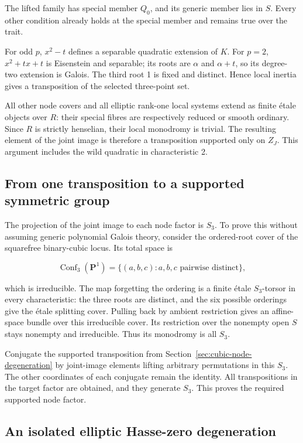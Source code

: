 \documentclass[11pt]{article}
\begin{document}
The lifted family has special member \(Q_0\), and its generic member lies in \(S\). Every other condition already holds at the special member and remains true over the trait.

For odd \(p\), \(x^2-t\) defines a separable quadratic extension of \(K\). For \(p=2\), \(x^2+tx+t\) is Eisenstein and separable; its roots are \(\alpha\) and \(\alpha+t\), so its degree-two extension is Galois. The third root 1 is fixed and distinct. Hence local inertia gives a transposition of the selected three-point set.

All other node covers and all elliptic rank-one local systems extend as finite étale objects over \(R\): their special fibres are respectively reduced or smooth ordinary. Since \(R\) is strictly henselian, their local monodromy is trivial. The resulting element of the joint image is therefore a transposition supported only on \(Z_J\). This argument includes the wild quadratic in characteristic 2.

\subsection{From one transposition to a supported symmetric group}\label{sec:cubic-node-group}

The projection of the joint image to each node factor is \(S_3\). To prove this without assuming generic polynomial Galois theory, consider the ordered-root cover of the squarefree binary-cubic locus. Its total space is

\[
\operatorname{Conf}_3(\mathbf P^1)
=\{(a,b,c):a,b,c\text{ pairwise distinct}\},
\]

which is irreducible. The map forgetting the ordering is a finite étale \(S_3\)-torsor in every characteristic: the three roots are distinct, and the six possible orderings give the étale splitting cover. Pulling back by ambient restriction gives an affine-space bundle over this irreducible cover. Its restriction over the nonempty open \(S\) stays nonempty and irreducible. Thus its monodromy is all \(S_3\).

Conjugate the supported transposition from Section~\ref{sec:cubic-node-degeneration} by joint-image elements lifting arbitrary permutations in this \(S_3\). The other coordinates of each conjugate remain the identity. All transpositions in the target factor are obtained, and they generate \(S_3\). This proves the required supported node factor.

\subsection{An isolated elliptic Hasse-zero degeneration}\label{sec:cubic-scalar}
\end{document}
